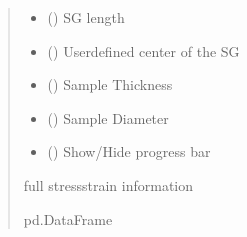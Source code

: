 \documentclass[letterpaper,10pt,english]{sphinxmanual}
\begin{document}
\begin{fulllineitems}
\begin{quote}
\begin{description}
\begin{itemize}
\item {} 
\sphinxAtStartPar
{} () \textendash{} SG length

\item {} 
\sphinxAtStartPar
{} (\sphinxstyleliteralemphasis{\sphinxupquote{{[}}}\sphinxstyleliteralemphasis{\sphinxupquote{, }}\sphinxstyleliteralemphasis{\sphinxupquote{, }}\sphinxstyleliteralemphasis{\sphinxupquote{{]}}}) \textendash{} User\sphinxhyphen{}defined center of the SG

\item {} 
\sphinxAtStartPar
{} () \textendash{} Sample Thickness

\item {} 
\sphinxAtStartPar
{} () \textendash{} Sample Diameter

\item {} 
\sphinxAtStartPar
{} () \textendash{} Show/Hide progress bar

\end{itemize}

\sphinxAtStartPar
full stress\sphinxhyphen{}strain information

\sphinxAtStartPar
pd.DataFrame

\end{description}\end{quote}

\end{fulllineitems}

\end{document}
